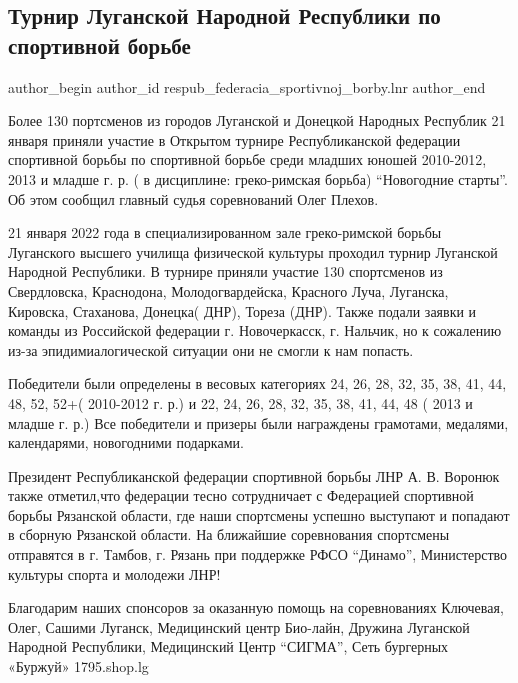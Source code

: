  
 
 
 
 
 
\subsection{Турнир Луганской Народной Республики по спортивной борьбе}
\label{sec:25_01_2022.vk.respub_federacia_sportivnoj_borby.lnr.1.turnir}
 
\ifcmt
 author_begin
   author_id respub_federacia_sportivnoj_borby.lnr
 author_end
\fi

Более 130 портсменов из городов Луганской и Донецкой Народных Республик 21
января приняли участие в Открытом турнире Республиканской федерации
спортивной борьбы по спортивной борьбе среди младших юношей 2010-2012, 2013 и
младше г. р. ( в дисциплине: греко-римская борьба) \enquote{Новогодние старты}. Об
этом сообщил главный судья соревнований Олег Плехов.


21 января 2022 года в специализированном зале греко-римской борьбы Луганского
высшего училища физической культуры проходил турнир Луганской Народной
Республики. В турнире приняли участие 130 спортсменов из
Свердловска, Краснодона, Молодогвардейска, Красного
Луча, Луганска, Кировска, Стаханова, Донецка( ДНР), Тореза (ДНР). Также
подали заявки и команды из Российской федерации г. Новочеркасск, г. Нальчик, но
к сожалению из-за эпидимиалогической ситуации они не смогли к нам попасть.


Победители были определены в весовых категориях
24, 26, 28, 32, 35, 38, 41, 44, 48, 52, 52+( 2010-2012 г. р.) и
22, 24, 26, 28, 32, 35, 38, 41, 44, 48 ( 2013 и младше г. р.) Все победители и призеры
были награждены грамотами, медалями, календарями, новогодними подарками.

Президент Республиканской федерации спортивной борьбы ЛНР А. В. Воронюк также
отметил,что федерации тесно сотрудничает с Федерацией спортивной борьбы
Рязанской области, где наши спортсмены успешно выступают и попадают в сборную
Рязанской области. На ближайшие соревнования спортсмены отправятся в г. Тамбов,
г. Рязань при поддержке РФСО \enquote{Динамо}, Министерство культуры спорта и
молодежи ЛНР!

Благодарим наших спонсоров за оказанную помощь на соревнованиях Ключевая, Олег,
Сашими Луганск, Медицинский центр Био-лайн, Дружина Луганской Народной
Республики, Медицинский Центр \enquote{СИГМА}, Сеть бургерных «Буржуй» 1795.shop.lg
